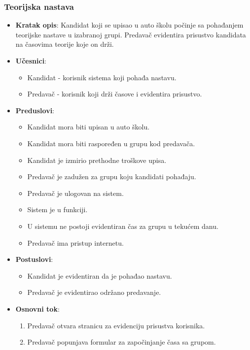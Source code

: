 \subsubsection{Teorijska nastava}
\label{subsubsec:prijava za nastavu}
\begin{itemize}
  \item \textbf{Kratak opis}: Kandidat koji se upisao u auto školu počinje sa pohađanjem teorijske nastave u izabranoj grupi. 
  Predavač evidentira prisustvo kandidata na časovima teorije koje on drži.
  \item \textbf{Učesnici}:
    \begin{itemize}
    \item  Kandidat - korisnik sistema koji pohađa nastavu.
    \item  Predavač - korisnik koji drži časove i evidentira prisustvo.
    \end{itemize}
  \item \textbf{Preduslovi}:
    \begin{itemize}
    \item  Kandidat mora biti upisan u auto školu.
    \item  Kandidat mora biti raspoređen u grupu kod predavača.
    \item  Kandidat je izmirio  prethodne troškove upisa.
    \item  Predavač je zadužen za grupu koju kandidati pohađaju.
    \item  Predavač je ulogovan na sistem.
    \item  Sistem je u funkciji.
    \item  U sistemu ne postoji evidentiran čas za grupu u tekućem danu.
    \item  Predavač  ima pristup internetu.
    \end{itemize}
  \item \textbf{Postuslovi}:
      \begin{itemize}
      \item Kandidat je evidentiran da je pohađao nastavu.
      \item Predavač je evidentirao održano predavanje.
      \end{itemize}
  \item \textbf{Osnovni tok}:
      \begin{enumerate}
        \item Predavač otvara stranicu za evidenciju prisustva korisnika.
        \item Predavač popunjava formular za započinjanje časa sa grupom.

\end{enumerate}
\end{itemize}
